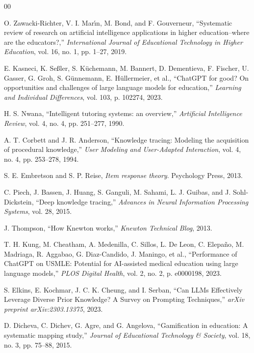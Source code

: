 \documentclass[conference]{IEEEtran}
\begin{document}
\begin{thebibliography}{00}

 O. Zawacki-Richter, V. I. Mar{\'\i}n, M. Bond, and F. Gouverneur, ``Systematic review of research on artificial intelligence applications in higher education--where are the educators?,'' \textit{International Journal of Educational Technology in Higher Education}, vol. 16, no. 1, pp. 1--27, 2019.

 E. Kasneci, K. Se{\ss}ler, S. K{\"u}chemann, M. Bannert, D. Dementieva, F. Fischer, U. Gasser, G. Groh, S. G{\"u}nnemann, E. H{\"u}llermeier, et al., ``ChatGPT for good? On opportunities and challenges of large language models for education,'' \textit{Learning and Individual Differences}, vol. 103, p. 102274, 2023.

 H. S. Nwana, ``Intelligent tutoring systems: an overview,'' \textit{Artificial Intelligence Review}, vol. 4, no. 4, pp. 251--277, 1990.

 A. T. Corbett and J. R. Anderson, ``Knowledge tracing: Modeling the acquisition of procedural knowledge,'' \textit{User Modeling and User-Adapted Interaction}, vol. 4, no. 4, pp. 253--278, 1994.

 S. E. Embretson and S. P. Reise, \textit{Item response theory}. Psychology Press, 2013.

 C. Piech, J. Bassen, J. Huang, S. Ganguli, M. Sahami, L. J. Guibas, and J. Sohl-Dickstein, ``Deep knowledge tracing,'' \textit{Advances in Neural Information Processing Systems}, vol. 28, 2015.

 J. Thompson, ``How Knewton works,'' \textit{Knewton Technical Blog}, 2013.

 T. H. Kung, M. Cheatham, A. Medenilla, C. Sillos, L. De Leon, C. Elepa{\~n}o, M. Madriaga, R. Aggabao, G. Diaz-Candido, J. Maningo, et al., ``Performance of ChatGPT on USMLE: Potential for AI-assisted medical education using large language models,'' \textit{PLOS Digital Health}, vol. 2, no. 2, p. e0000198, 2023.

 S. Elkins, E. Kochmar, J. C. K. Cheung, and I. Serban, ``Can LLMs Effectively Leverage Diverse Prior Knowledge? A Survey on Prompting Techniques,'' \textit{arXiv preprint arXiv:2303.13375}, 2023.

 D. Dicheva, C. Dichev, G. Agre, and G. Angelova, ``Gamification in education: A systematic mapping study,'' \textit{Journal of Educational Technology \& Society}, vol. 18, no. 3, pp. 75--88, 2015.


\end{thebibliography}
\end{document}
